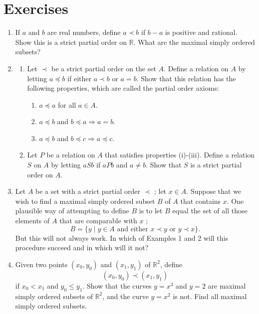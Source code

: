 \section*{Exercises}
\begin{enumerate}[itemsep=0.4em, parsep=0pt, topsep=0pt, partopsep=0pt, leftmargin=*, label=\arabic*., ref=\arabic*]
\item If \(a\) and \(b\) are real numbers, define \(a \prec b\) if \(b - a\) is positive and rational. Show this is a strict partial order on \(\mathbb{R}\). What are the maximal simply ordered subsets?
\item
  \begin{enumerate}[itemsep=0.2em, parsep=0pt, topsep=0pt, partopsep=0pt, leftmargin=*, label=(\alph*), align=left]
  \item Let \(\prec\) be a strict partial order on the set \(A\). Define a relation on \(A\) by letting \(a \preccurlyeq b\) if either \(a \prec b\) or \(a = b\). Show that this relation has the following properties, which are called the partial order axioms:
    \begin{enumerate}[itemsep=0.2em, parsep=0pt, topsep=0pt, partopsep=0pt, leftmargin=*, label=(\roman*), align=left]
    \item \(a \preccurlyeq a\) for all \(a \in A\).
    \item \(a \preccurlyeq b\) and \(b \preccurlyeq a \Rightarrow a = b\).
    \item \(a \preccurlyeq b\) and \(b \preccurlyeq c \Rightarrow a \preccurlyeq c\).
    \end{enumerate}
  \item Let \(P\) be a relation on \(A\) that satisfies properties (i)-(iii). Define a relation \(S\) on \(A\) by letting \({aSb}\) if \({aPb}\) and \(a \neq b\). Show that \(S\) is a strict partial order on \(A\).
  \end{enumerate}
\item Let \(A\) be a set with a strict partial order \(\prec\) ; let \(x \in A\). Suppose that we wish to find a maximal simply ordered subset \(B\) of \(A\) that contains \(x\). One plausible way of attempting to define \(B\) is to let \(B\) equal the set of all those elements of \(A\) that are comparable with \(x\) ; \[ B = \{ y \mid y \in A\text{ and either }x \prec y\text{ or }y \prec x\}. \] But this will not always work. In which of Examples 1 and 2 will this procedure succeed and in which will it not?
\item Given two points \(({x_{0},y_{0}})\) and \(({x_{1},y_{1}})\) of \(\mathbb{R}^{2}\), define \[ ({x_{0},y_{0}}) \prec ({x_{1},y_{1}}) \] if \(x_{0} < x_{1}\) and \(y_{0} \leq {y}_{1}\). Show that the curves \(y = x^{3}\) and \(y = 2\) are maximal simply ordered subsets of \(\mathbb{R}^{2}\), and the curve \(y = x^{2}\) is not. Find all maximal simply ordered subsets.

\end{enumerate}
